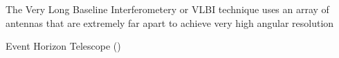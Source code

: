 The Very Long Baseline Interferometery or VLBI technique uses an array of antennas that are extremely far apart to achieve very high angular resolution


Event Horizon Telescope (\cite{2012Sci...338..355D})


%

